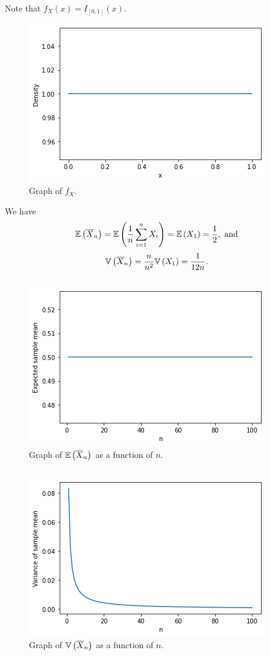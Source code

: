 \begin{ex}
  Note that $f_X(x)=I_{[0,1]}(x)$.
  \begin{figure}[H]
    \centering
    \includegraphics[scale=0.8]{part1/ch03-19a}
    \caption{Graph of $f_X$.}
  \end{figure}

  We have
  \[
    \mathbb{E}\left(\overline{X}_n\right)
    =\mathbb{E}\left(\frac{1}{n}\sum_{i=1}^n X_i\right)
    =\mathbb{E}\left(X_1\right)=\frac{1}{2}, \text{ and}
  \]
  \[
    \mathbb{V}\left(\overline{X}_n\right)
    =\frac{n}{n^2}\mathbb{V}\left(X_1\right)
    =\frac{1}{12n}.
  \]

  \inputminted{python}{src/03-19b.py}

  \begin{figure}[H]
    \centering
    \includegraphics[scale=0.8]{part1/ch03-19b}
    \caption{Graph of $\mathbb{E}\left(\overline{X}_n\right)$ as a function of $n$.}
  \end{figure}

  \inputminted{python}{src/03-19c.py}

  \begin{figure}[H]
    \centering
    \includegraphics[scale=0.95]{part1/ch03-19c}
    \caption{Graph of $\mathbb{V}\left(\overline{X}_n\right)$ as a function of $n$.}
  \end{figure}


\end{ex}
